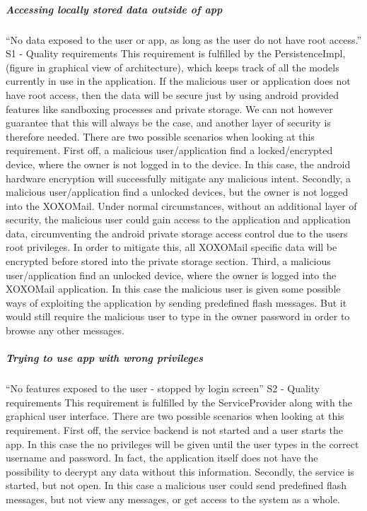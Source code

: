\subparagraph{Accessing locally stored data outside of app}
“No data exposed to the user or app, as long as the user do not have root access.” S1 - Quality requirements
\newline
\newline
This requirement is fulfilled by the PersistenceImpl, (figure in graphical view of architecture), which keeps track of all the models currently in use in the application. If the malicious user or application does not have root access, then the data will be secure just by using android provided features like sandboxing processes and private storage. We can not however guarantee that this will always be the case, and another layer of security is therefore needed. 
\newline
\newline
There are two possible scenarios when looking at this requirement. First off, a malicious user/application find a locked/encrypted device, where the owner is not logged in to the device. In this case, the android hardware encryption will successfully mitigate any malicious intent.
Secondly, a malicious user/application find a unlocked devices, but the owner is not logged into the XOXOMail. Under normal circumstances, without an additional layer of security, the malicious user could gain access to the application and application data, circumventing the android private storage access control due to the users root privileges. In order to mitigate this, all XOXOMail specific data will be encrypted before stored into the private storage section. 
Third, a malicious user/application find an unlocked device, where the owner is logged into the XOXOMail application. In this case the malicious user is given some possible ways of exploiting the application by sending predefined flash messages. But it would still require the malicious user to type in the owner password in order to browse any other messages. 

\subparagraph{Trying to use app with wrong privileges}
“No features exposed to the user - stopped by login screen” S2 - Quality requirements
\newline
\newline
This requirement is fulfilled by the ServiceProvider along with the graphical user interface. There are two possible scenarios when looking at this requirement. First off, the service backend is not started and a user starts the app. In this case the no privileges will be given until the user types in the correct username and password. In fact, the application itself does not have the possibility to decrypt any data without this information.
	Secondly, the service is started, but not open. In this case a malicious user could send predefined flash messages, but not view any messages, or get access to the system as a whole. 

